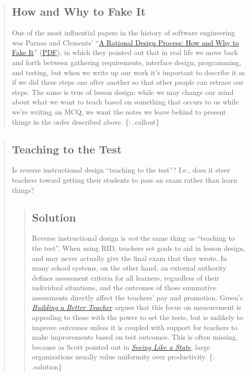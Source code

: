 \begin{quote}
\subsection{How and Why to Fake It}\label{how-and-why-to-fake-it}

One of the most influential papers in the history of software
engineering was Parnas and Clements'
``\href{http://dx.doi.org/10.1109/TSE.1986.6312940}{A Rational Design
Process: How and Why to Fake It}''
(\href{http://www.ics.uci.edu/~taylor/classes/121/IEEE86\_Parnas\_Clement.pdf}{PDF}),
in which they pointed out that in real life we move back and forth
between gathering requirements, interface design, programming, and
testing, but when we write up our work it's important to describe it as
if we did these steps one after another so that other people can retrace
our steps. The same is true of lesson design: while we may change our
mind about what we want to teach based on something that occurs to us
while we're writing an MCQ, we want the notes we leave behind to present
things in the order described above. \{: .callout\}
\end{quote}

\begin{quote}
\subsection{Teaching to the Test}\label{teaching-to-the-test}

Is reverse instructional design ``teaching to the test''? I.e., does it
steer teachers toward getting their students to pass an exam rather than
learn things?

\begin{quote}
\subsection{Solution}\label{solution}

Reverse instructional design is \emph{not} the same thing as ``teaching
to the test''. When using RID, teachers set goals to aid in lesson
design, and may never actually give the final exam that they wrote. In
many school systems, on the other hand, an external authority defines
assessment criteria for all learners, regardless of their individual
situations, and the outcomes of those summative assessments directly
affect the teachers' pay and promotion. Green's
\emph{\href{http://www.amazon.com/Building-Better-Teacher-Teaching-Everyone/dp/0393351084/}{Building
a Better Teacher}} argues that this focus on measurement is appealing to
those with the power to set the tests, but is unlikely to improve
outcomes unless it is coupled with support for teachers to make
improvements based on test outcomes. This is often missing, because as
Scott pointed out in
\emph{\href{http://www.amazon.com/Seeing-like-State-Certain-Condition/dp/0300078153/}{Seeing
Like a State}}, large organizations usually value uniformity over
productivity. \{: .solution\}
\end{quote}
\end{quote}


